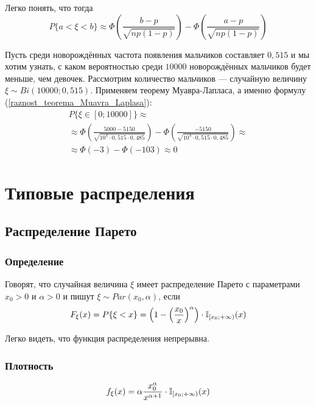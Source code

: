 Легко понять, что тогда
\begin{equation}\label{raznost_teorema_Muavra_Laplasa}
P\{a<\xi<b\} \approx \Phi\left( \frac{b-p}{\sqrt{np(1-p)}} \right) - \Phi\left( \frac{a-p}{\sqrt{np(1-p)}} \right)
\end{equation}

\begin{primer}
Пусть среди новорождённых частота появления мальчиков составляет $0,515$ и мы хотим узнать, с каком вероятностью среди $10000$ новорождённых мальчиков будет меньше, чем девочек.
Рассмотрим количество мальчиков --- случайную величину $\xi \sim Bi(10000; 0,515)$.
Применяем теорему Муавра-Лапласа, а именно формулу (\ref{raznost_teorema_Muavra_Laplasa}):
\begin{multline*}
P\{\xi\in[0; 10000]\} \approx
\\ \approx
\Phi\left( \frac{5000-5150}{\sqrt{10^4 \cdot 0,515 \cdot 0,485 }} \right) - \Phi\left( \frac{-5150}{\sqrt{10^4 \cdot 0,515 \cdot 0,485 }} \right) \approx
\\ \approx
\Phi(-3) - \Phi(-103) \approx 0
\end{multline*}

\end{primer}

\chapter{Типовые распределения}

\section{Распределение Парето}
\subsection{Определение}
\opred
Говорят, что случайная величина $\xi$ имеет распределение Парето с параметрами $x_0>0$ и $\alpha>0$ и пишут $\xi \sim Par(x_0,\alpha)$, если
$$
F_\xi (x) = P\{\xi < x\} = \left(1 - \left(\frac{x_0}{x}\right)^\alpha\right) \cdot \mathbb{I}_{[x_0; +\infty)}(x)
$$

Легко видеть, что функция распределения непрерывна.
\subsection{Плотность}
$$
f_\xi (x) = \alpha\frac{x_0^\alpha}{x^{\alpha+1}} \cdot \mathbb{I}_{[x_0; +\infty)}(x)
$$

